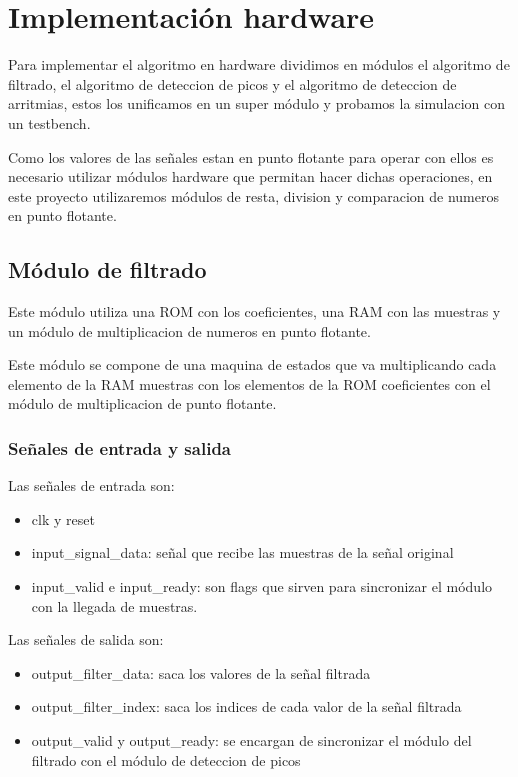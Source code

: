 \chapter{Implementación hardware}

Para implementar el algoritmo en hardware dividimos en módulos el algoritmo de filtrado, el algoritmo
de deteccion de picos y el algoritmo de deteccion de arritmias, estos los unificamos en un super módulo 
y probamos la simulacion con un testbench.

Como los valores de las señales estan en punto flotante para operar con ellos es necesario utilizar módulos
hardware que permitan hacer dichas operaciones, en este proyecto utilizaremos módulos de resta, division y 
comparacion de numeros en punto flotante.

\section{Módulo de filtrado}

Este módulo utiliza una ROM con los coeficientes, una RAM con las muestras y un módulo de multiplicacion
de numeros en punto flotante.

Este módulo se compone de una maquina de estados que va multiplicando cada elemento de la RAM muestras 
con los elementos de la ROM coeficientes con el módulo de multiplicacion de punto flotante.

\subsection{Señales de entrada y salida}

Las señales de entrada son:

\begin{itemize}
\item clk y reset
\item input\_signal\_data: señal que recibe las muestras de la señal original 
\item input\_valid e input\_ready: son flags que sirven para sincronizar el módulo con la llegada de muestras. 
\end{itemize}

Las señales de salida son:

\begin{itemize}
    \item output\_filter\_data: saca los valores de la señal filtrada
    \item output\_filter\_index: saca los indices de cada valor de la señal filtrada
    \item output\_valid y output\_ready: se encargan de sincronizar el módulo del filtrado 
    con el módulo de deteccion de picos
\end{itemize}



